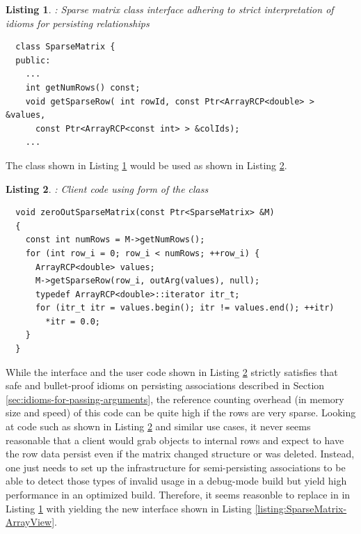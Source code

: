 \documentclass[pdf,ps2pdf,11pt]{SANDreport}
\newtheorem{listing}{Listing}
\begin{document}
\begin{listing}: Sparse matrix class interface adhering to strict
interpretation of idioms for persisting relationships  \\
\label{listing:SparseMatrix-ArrayRCP}
{\small\begin{verbatim}
  class SparseMatrix {
  public:
    ...
    int getNumRows() const;
    void getSparseRow( int rowId, const Ptr<ArrayRCP<double> > &values,
      const Ptr<ArrayRCP<const int> > &colIds);
    ...
\end{verbatim}}
\end{listing}


The {} class shown in Listing
{}\ref{listing:SparseMatrix-ArrayRCP} would be used as shown in
Listing {}\ref{listing:zeroOutSparseMatrix-ArrayRCP}.


\begin{listing}: Client code using {} form of the
 {} class  \\
\label{listing:zeroOutSparseMatrix-ArrayRCP}
{\small\begin{verbatim}
  void zeroOutSparseMatrix(const Ptr<SparseMatrix> &M)
  {
    const int numRows = M->getNumRows();
    for (int row_i = 0; row_i < numRows; ++row_i) {
      ArrayRCP<double> values;
      M->getSparseRow(row_i, outArg(values), null);
      typedef ArrayRCP<double>::iterator itr_t;
      for (itr_t itr = values.begin(); itr != values.end(); ++itr)
        *itr = 0.0;
    }
  }
\end{verbatim}}
\end{listing}


While the interface and the user code shown in Listing
{}\ref{listing:zeroOutSparseMatrix-ArrayRCP} strictly satisfies that
safe and bullet-proof idioms on persisting associations described in
Section {}\ref{sec:idioms-for-passing-arguments}, the reference
counting overhead (in memory size and speed) of this code can be quite
high if the rows are very sparse.  Looking at code such as shown in
Listing {}\ref{listing:zeroOutSparseMatrix-ArrayRCP} and similar use
cases, it never seems reasonable that a client would grab
{} objects to internal rows and expect to have the row
data persist even if the matrix changed structure or was deleted.
Instead, one just needs to set up the infrastructure for
semi-persisting associations to be able to detect those types of
invalid usage in a debug-mode build but yield high performance in an
optimized build.  Therefore, it seems reasonble to replace
{} in {} in Listing
{}\ref{listing:SparseMatrix-ArrayRCP} with {} yielding
the new {} interface shown in Listing
{}\ref{listing:SparseMatrix-ArrayView}.
\end{document}
